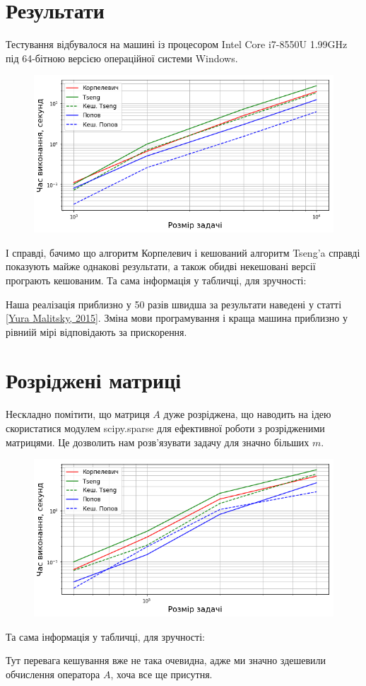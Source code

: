 \section{Результати}

Тестування відбувалося на машині із процесором Intel Core i7-8550U 1.99GHz під 64-бітною версією операційної системи Windows.

\begin{figure}[H]
    \centering
    \includegraphics[width=.75\textwidth]{img/1/time.png}
\end{figure}

І справді, бачимо що алгоритм Корпелевич і кешований алгоритм Tseng'a справді показують майже однакові результати, а також обидві некешовані версії програють кешованим. Та сама інформація у табличці, для зручності:





\begin{remark}
    Наша реалізація приблизно у 50 разів швидша за результати наведені у статті \href{https://arxiv.org/abs/1502.04968v1}{[Yura Malitsky, 2015]}. Зміна мови програмування і краща машина приблизно у рівниій мірі відповідають за прискорення.
\end{remark}

\section{Розріджені матриці}

Нескладно помітити, що матриця $A$ дуже розріджена, що наводить на ідею скористатися модулем scipy.sparse для ефективної роботи з розрідженими матрицями. Це дозволить нам розв'язувати задачу для значно більших $m$.

\begin{figure}[H]
    \centering
    \includegraphics[width=.75\textwidth]{img/1/sparse/time.png}
\end{figure}

Та сама інформація у табличці, для зручності:





\begin{remark}
    Тут перевага кешування вже не така очевидна, адже ми значно здешевили обчислення оператора $A$, хоча все ще присутня.
\end{remark}
